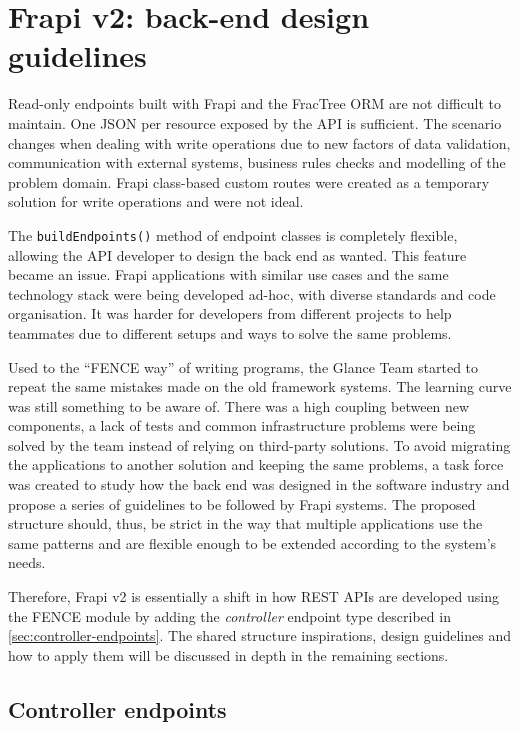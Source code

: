 \chapter{Frapi v2: back-end design guidelines}
\label{chap4}

Read-only endpoints built with Frapi and the FracTree ORM are not difficult to maintain. One JSON per resource exposed by the API is sufficient. The scenario changes when dealing with write operations due to new factors of data validation, communication with external systems, business rules checks and modelling of the problem domain.
Frapi class-based custom routes were created as a temporary solution for write operations and were not ideal.

The \texttt{buildEndpoints()} method of endpoint classes is completely flexible, allowing the API developer to design the back end as wanted. This feature became an issue. Frapi applications with similar use cases and the same technology stack were being developed ad-hoc, with diverse standards and code organisation. It was harder for developers from different projects to help teammates due to different setups and ways to solve the same problems.

Used to the ``FENCE way'' of writing programs, the Glance Team started to repeat the same mistakes made on the old framework systems. The learning curve was still something to be aware of. There was a high coupling between new components, a lack of tests and common infrastructure problems were being solved by the team instead of relying on third-party solutions. To avoid migrating the applications to another solution and keeping the same problems, a task force was created to study how the back end was designed in the software industry and propose a series of guidelines to be followed by Frapi systems. The proposed structure should, thus, be strict in the way that multiple applications use the same patterns and are flexible enough to be extended according to the system's needs.

Therefore, Frapi v2 is essentially a shift in how REST APIs are developed using the FENCE module by adding the \textit{controller} endpoint type described in \autoref{sec:controller-endpoints}. The shared structure inspirations, design guidelines and how to apply them will be discussed in depth in the remaining sections.

\section{Controller endpoints}
\label{sec:controller-endpoints}

